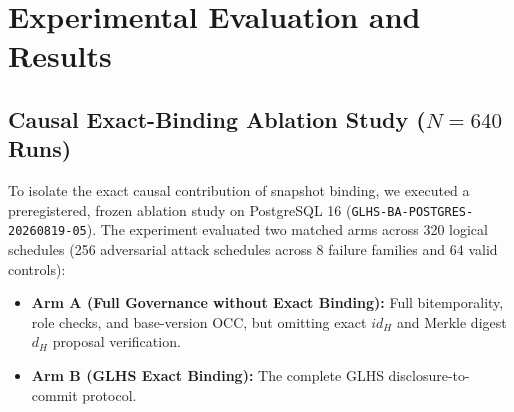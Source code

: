 \documentclass[11pt,a4paper]{article}
\begin{document}
\section{Experimental Evaluation and Results}

\subsection{Causal Exact-Binding Ablation Study (\texorpdfstring{$N=640$}{N=640} Runs)}
To isolate the exact causal contribution of snapshot binding, we executed a preregistered, frozen ablation study on PostgreSQL 16 (\texttt{GLHS-BA-POSTGRES-20260819-05}). The experiment evaluated two matched arms across 320 logical schedules (256 adversarial attack schedules across 8 failure families and 64 valid controls):
\begin{itemize}
  \item \textbf{Arm A (Full Governance without Exact Binding):} Full bitemporality, role checks, and base-version OCC, but omitting exact $id_H$ and Merkle digest $d_H$ proposal verification.
  \item \textbf{Arm B (GLHS Exact Binding):} The complete GLHS disclosure-to-commit protocol.
\end{itemize}
\end{document}
